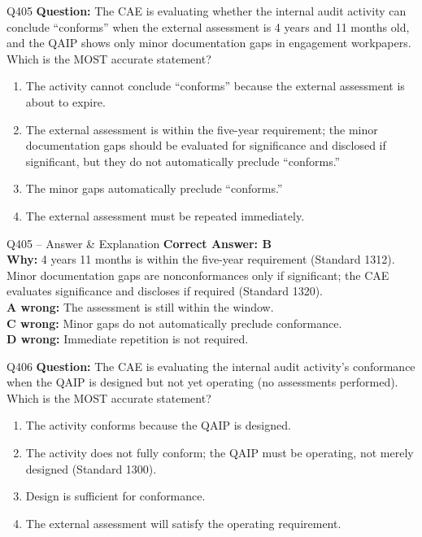 \documentclass[aspectratio=169,10pt]{beamer}
\begin{document}
	\begin{frame}[t]{Q405}
		\small
		\textbf{Question:} The CAE is evaluating whether the internal audit activity can conclude ``conforms'' when the external assessment is 4 years and 11 months old, and the QAIP shows only minor documentation gaps in engagement workpapers. Which is the MOST accurate statement?
		\begin{enumerate}[label=\Alph*.,itemsep=1pt,topsep=2pt]
			\item The activity cannot conclude ``conforms'' because the external assessment is about to expire.
			\item The external assessment is within the five-year requirement; the minor documentation gaps should be evaluated for significance and disclosed if significant, but they do not automatically preclude ``conforms.''
			\item The minor gaps automatically preclude ``conforms.''
			\item The external assessment must be repeated immediately.
		\end{enumerate}
	\end{frame}
	
	\begin{frame}[t]{Q405 -- Answer \& Explanation}
		\small
		\textbf{Correct Answer: B} \\[4pt]
		\textbf{Why:} 4 years 11 months is within the five-year requirement (Standard 1312). Minor documentation gaps are nonconformances only if significant; the CAE evaluates significance and discloses if required (Standard 1320). \\[4pt]
		\textbf{A wrong:} The assessment is still within the window. \\[2pt]
		\textbf{C wrong:} Minor gaps do not automatically preclude conformance. \\[2pt]
		\textbf{D wrong:} Immediate repetition is not required.
	\end{frame}
	
	\begin{frame}[t]{Q406}
		\small
		\textbf{Question:} The CAE is evaluating the internal audit activity's conformance when the QAIP is designed but not yet operating (no assessments performed). Which is the MOST accurate statement?
		\begin{enumerate}[label=\Alph*.,itemsep=1pt,topsep=2pt]
			\item The activity conforms because the QAIP is designed.
			\item The activity does not fully conform; the QAIP must be operating, not merely designed (Standard 1300).
			\item Design is sufficient for conformance.
			\item The external assessment will satisfy the operating requirement.
		\end{enumerate}
	\end{frame}
	
\end{document}

